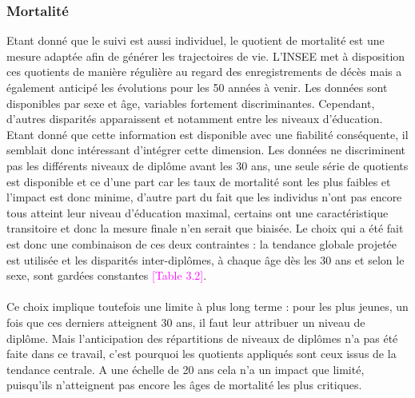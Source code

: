 \documentclass{bredele}
\begin{document}
\subsubsection{Mortalité}
Etant donné que le suivi est aussi individuel, le quotient de mortalité est une mesure adaptée afin de générer les trajectoires de vie. L'INSEE met à disposition ces quotients de manière régulière au regard des enregistrements de décès mais a également anticipé les évolutions pour les 50 années à venir. Les données sont disponibles par sexe et âge, variables fortement discriminantes. Cependant, d'autres disparités apparaissent et notamment entre les niveaux d'éducation. Etant donné que cette information est disponible avec une fiabilité conséquente, il semblait donc intéressant d'intégrer cette dimension. Les données ne discriminent pas les différents niveaux de diplôme avant les 30 ans, une seule série de quotients est disponible et ce d'une part car les taux de mortalité sont les plus faibles et l'impact est donc minime, d'autre part du fait que les individus n'ont pas encore tous atteint leur niveau d'éducation maximal, certains ont une caractéristique transitoire et donc la mesure finale n'en serait que biaisée. Le choix qui a été fait est donc une combinaison de ces deux contraintes : la tendance globale projetée est utilisée et les disparités inter-diplômes, à chaque âge dès les 30 ans et selon le sexe, sont gardées constantes \textcolor{magenta}{[Table 3.2]}.
\\\\
Ce choix implique toutefois une limite à plus long terme : pour les plus jeunes, un fois que ces derniers atteignent 30 ans, il faut leur attribuer un niveau de diplôme. Mais l'anticipation des répartitions de niveaux de diplômes n'a pas été faite dans ce travail, c'est pourquoi les quotients appliqués sont ceux issus de la tendance centrale. A une échelle de 20 ans cela n'a un impact que limité, puisqu'ils n'atteignent pas encore les âges de mortalité les plus critiques.
\end{document}
